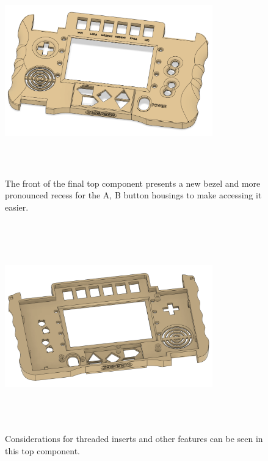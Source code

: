 \begin{figure} [h]
    \centering
    \includegraphics[width=9cm,height=9cm,keepaspectratio]{Figures/iteration4_top_front.png}
    \caption{The front of the final top component presents a new bezel and more pronounced recess for the A, B button housings to make accessing it easier.}
    \label{fig:iteration4_t_f}
\end{figure}

\begin{figure} [h]
    \centering
    \includegraphics[width=9cm,height=9cm,keepaspectratio]{Figures/iteration4_top_back.png}
    \caption{Considerations for threaded inserts and other features can be seen in this top component.}
    \label{fig:iteration4_t_b}
\end{figure}

